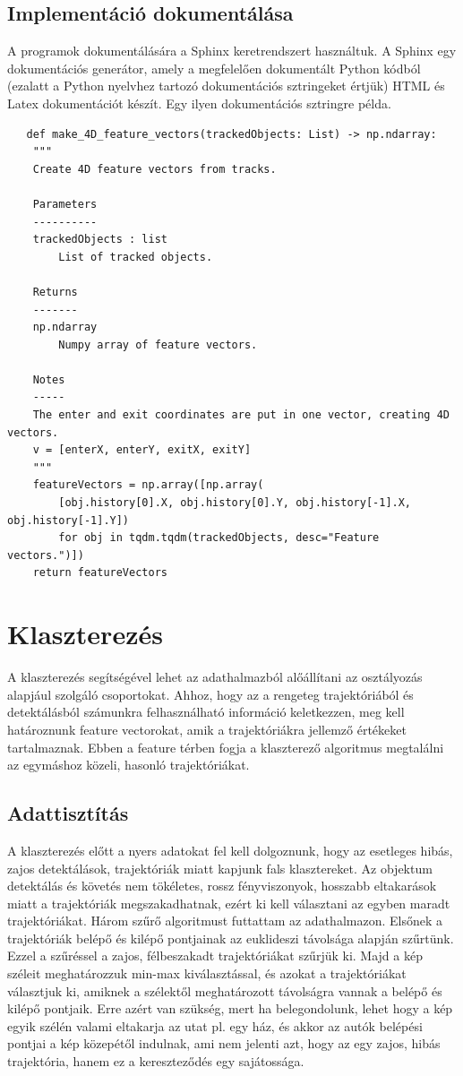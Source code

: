 \documentclass[12pt,a4paper]{article}
\begin{document}
\subsection{Implementáció dokumentálása}
A programok dokumentálására a Sphinx \cite{brandl2021sphinx} keretrendszert használtuk. A Sphinx egy dokumentációs generátor, amely a megfelelően dokumentált
Python kódból (ezalatt a Python nyelvhez tartozó dokumentációs sztringeket értjük) HTML és Latex dokumentációt készít. Egy ilyen dokumentációs sztringre példa.
\begin{verbatim}
   def make_4D_feature_vectors(trackedObjects: List) -> np.ndarray:
    """
    Create 4D feature vectors from tracks.

    Parameters
    ----------
    trackedObjects : list
        List of tracked objects.

    Returns
    -------
    np.ndarray
        Numpy array of feature vectors.

    Notes
    -----
    The enter and exit coordinates are put in one vector, creating 4D vectors.
    v = [enterX, enterY, exitX, exitY]
    """
    featureVectors = np.array([np.array(
        [obj.history[0].X, obj.history[0].Y, obj.history[-1].X, obj.history[-1].Y])
        for obj in tqdm.tqdm(trackedObjects, desc="Feature vectors.")])
    return featureVectors 
\end{verbatim}


\newpage
\section{Klaszterezés}
A klaszterezés segítségével lehet az adathalmazból alőállítani az osztályozás alapjául szolgáló csoportokat. Ahhoz, hogy az
a rengeteg trajektóriából és detektálásból számunkra felhasználható információ keletkezzen, meg kell határoznunk feature
vectorokat, amik a trajektóriákra jellemző értékeket tartalmaznak. Ebben a feature térben fogja a klaszterező algoritmus
megtalálni az egymáshoz közeli, hasonló trajektóriákat.
\subsection{Adattisztítás}
A klaszterezés előtt a nyers adatokat fel kell dolgoznunk, hogy az esetleges hibás, zajos detektálások, trajektóriák miatt
kapjunk fals klasztereket. Az objektum detektálás és követés nem tökéletes, rossz fényviszonyok, hosszabb eltakarások miatt
a trajektóriák megszakadhatnak, ezért ki kell választani az egyben maradt trajektóriákat. Három szűrő algoritmust futtattam
az adathalmazon. Elsőnek a trajektóriák belépő és kilépő pontjainak az euklideszi távolsága alapján szűrtünk. Ezzel a szűréssel a zajos, félbeszakadt trajektóriákat szűrjük ki.
Majd a kép széleit meghatározzuk min-max kiválasztással, és azokat a trajektóriákat választjuk ki, amiknek a szélektől meghatározott
távolságra vannak a belépő és kilépő pontjaik. Erre azért van szükség, mert ha belegondolunk, lehet hogy a kép egyik szélén valami eltakarja az utat pl. egy ház, és akkor az autók belépési pontjai a kép közepétől indulnak, ami nem jelenti azt, hogy az egy zajos, hibás trajektória, hanem ez a kereszteződés egy sajátossága.
\end{document}
